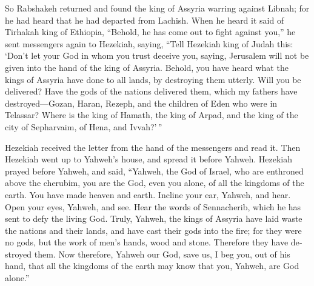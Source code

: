 \begin{paracol}{2}
\begin{otherlanguage}{english}
 So Rabshakeh returned and found the king of Assyria
warring against Libnah; for he had heard that he had departed from
Lachish.  When he heard it said of Tirhakah king of
Ethiopia, ``Behold, he has come out to fight against you,'' he sent
messengers again to Hezekiah, saying,  ``Tell Hezekiah
king of Judah this: `Don't let your God in whom you trust deceive you,
saying, Jerusalem will not be given into the hand of the king of
Assyria.  Behold, you have heard what the kings of
Assyria have done to all lands, by destroying them utterly. Will you be
delivered?  Have the gods of the nations delivered them,
which my fathers have destroyed---Gozan, Haran, Rezeph, and the children
of Eden who were in Telassar?  Where is the king of
Hamath, the king of Arpad, and the king of the city of Sepharvaim, of
Hena, and Ivvah?'\,''

 Hezekiah received the letter from the hand of the
messengers and read it. Then Hezekiah went up to Yahweh's house, and
spread it before Yahweh.  Hezekiah prayed before Yahweh,
and said, ``Yahweh, the God of Israel, who are enthroned above the
cherubim, you are the God, even you alone, of all the kingdoms of the
earth. You have made heaven and earth.  Incline your ear,
Yahweh, and hear. Open your eyes, Yahweh, and see. Hear the words of
Sennacherib, which he has sent to defy the living God. 
Truly, Yahweh, the kings of Assyria have laid waste the nations and
their lands,  and have cast their gods into the fire; for
they were no gods, but the work of men's hands, wood and stone.
Therefore they have destroyed them.  Now therefore,
Yahweh our God, save us, I beg you, out of his hand, that all the
kingdoms of the earth may know that you, Yahweh, are God alone.''


\end{otherlanguage}
\end{paracol}
